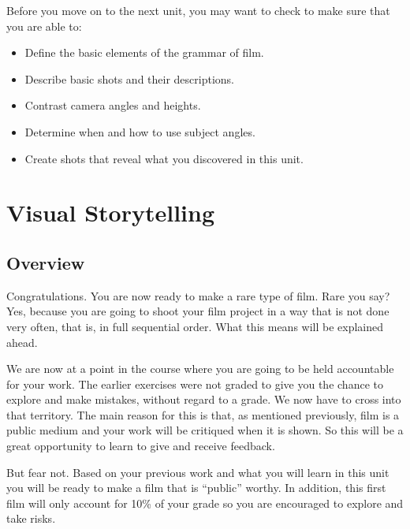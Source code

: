 \documentclass[
]{book}
\providecommand{\tightlist}{%
  \setlength{\itemsep}{0pt}\setlength{\parskip}{0pt}}
\begin{document}
\begin{progress}
Before you move on to the next unit, you may want to check to make sure that you are able to:

\begin{itemize}
\tightlist
\item
  Define the basic elements of the grammar of film.\\
\item
  Describe basic shots and their descriptions.\\
\item
  Contrast camera angles and heights.\\
\item
  Determine when and how to use subject angles.\\
\item
  Create shots that reveal what you discovered in this unit.
\end{itemize}
\end{progress}

\hypertarget{visual-storytelling}{%
\chapter{Visual Storytelling}\label{visual-storytelling}}

\hypertarget{overview-5}{%
\section*{Overview}\label{overview-5}}

Congratulations. You are now ready to make a rare type of film. Rare you say? Yes, because you are going to shoot your film project in a way that is not done very often, that is, in full sequential order. What this means will be explained ahead.

We are now at a point in the course where you are going to be held accountable for your work. The earlier exercises were not graded to give you the chance to explore and make mistakes, without regard to a grade. We now have to cross into that territory. The main reason for this is that, as mentioned previously, film is a public medium and your work will be critiqued when it is shown. So this will be a great opportunity to learn to give and receive feedback.

But fear not. Based on your previous work and what you will learn in this unit you will be ready to make a film that is ``public'' worthy. In addition, this first film will only account for 10\% of your grade so you are encouraged to explore and take risks.
\end{document}
